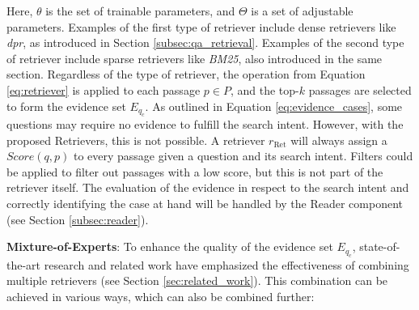 Here, $\theta$ is the set of trainable parameters, and $\Theta$ is a set of adjustable parameters. Examples of the first type of retriever include dense retrievers like \textit{\gls{dpr}}, as introduced in Section \ref{subsec:qa_retrieval}. Examples of the second type of retriever include sparse retrievers like \textit{BM25}, also introduced in the same section. Regardless of the type of retriever, the operation from Equation \ref{eq:retriever} is applied to each passage $p \in P$, and the top-$k$ passages are selected to form the evidence set $E_{q_c}$. As outlined in Equation \ref{eq:evidence_cases}, some questions may require no evidence to fulfill the search intent. However, with the proposed Retrievers, this is not possible. A retriever $r_{\text{Ret}}$ will always assign a $Score(q,p)$ to every passage given a question and its search intent. Filters could be applied to filter out passages with a low score, but this is not part of the retriever itself. The evaluation of the evidence in respect to the search intent and correctly identifying the case at hand will be handled by the Reader component (see Section \ref{subsec:reader}).

\vspace{\baselineskip}

\textbf{Mixture-of-Experts}: To enhance the quality of the evidence set $E_{q_c}$, state-of-the-art research and related work have emphasized the effectiveness of combining multiple retrievers (see Section \ref{sec:related_work}). This combination can be achieved in various ways, which can also be combined further:

